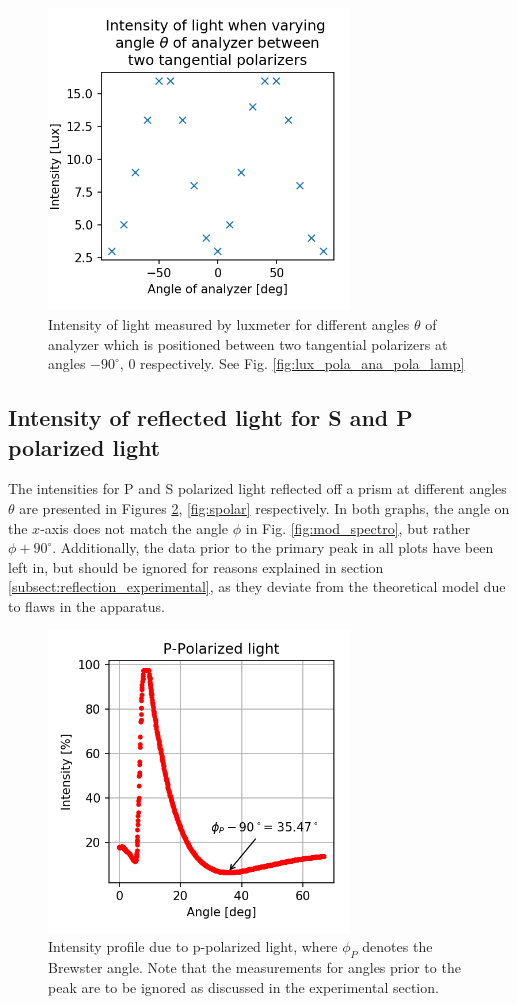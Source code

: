 \documentclass[11pt,a4paper, twocolumn]{article}
\begin{document}
  \begin{figure}[H]
    \center
    \includegraphics[width=8cm]{scripts/malus2.png}
    \caption{Intensity of light measured by luxmeter for different angles $\theta$ of analyzer which is positioned between two tangential polarizers at angles $-90^\circ$, $0$ respectively. See Fig. \ref{fig:lux_pola_ana_pola_lamp}}
    \label{fig:malus2}
  \end{figure}


  \subsection{Intensity of reflected light for S and P polarized light \label{sect:res_prism}}

  The intensities for P and S polarized light reflected off a prism at different angles $\theta$ are presented in Figures \ref{fig:ppolar}, \ref{fig:spolar} respectively. In both graphs, the angle on the $x$-axis does not match the angle $\phi$ in Fig. \ref{fig:mod_spectro}, but rather $\phi + 90^\circ$. Additionally, the data prior to the primary peak in all plots have been left in, but should be ignored for reasons explained in section \ref{subsect:reflection_experimental}, as they deviate from the theoretical model due to flaws in the apparatus.

  \begin{figure}[H]
    \center
    \includegraphics[width=8cm]{scripts/ppolar.png}
    \caption{Intensity profile due to p-polarized light, where $\phi_P$ denotes the Brewster angle. Note that the measurements for angles prior to the peak are to be ignored as discussed in the experimental section.}
    \label{fig:ppolar}
  \end{figure}
\end{document}
